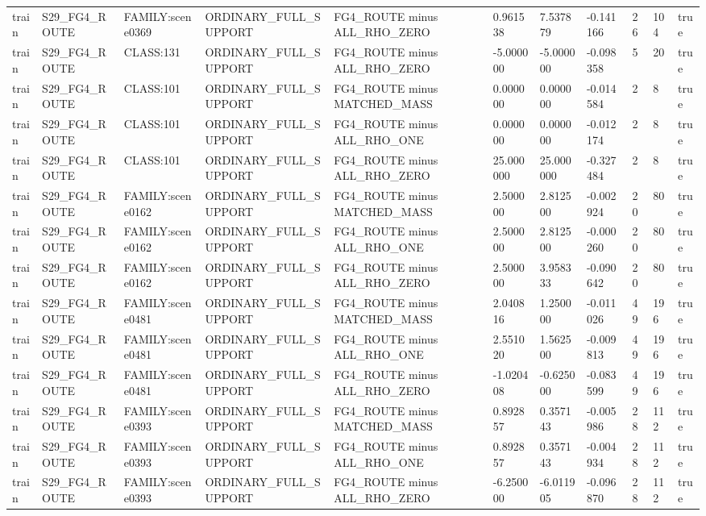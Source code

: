 \begin{tabular}{lllllllllll}
train & S29\_FG4\_ROUTE & FAMILY:scene0369 & ORDINARY\_FULL\_SUPPORT & FG4\_ROUTE minus ALL\_RHO\_ZERO & 0.961538 & 7.537879 & -0.141166 & 26 & 104 & true \\
train & S29\_FG4\_ROUTE & CLASS:131 & ORDINARY\_FULL\_SUPPORT & FG4\_ROUTE minus ALL\_RHO\_ZERO & -5.000000 & -5.000000 & -0.098358 & 5 & 20 & true \\
train & S29\_FG4\_ROUTE & CLASS:101 & ORDINARY\_FULL\_SUPPORT & FG4\_ROUTE minus MATCHED\_MASS & 0.000000 & 0.000000 & -0.014584 & 2 & 8 & true \\
train & S29\_FG4\_ROUTE & CLASS:101 & ORDINARY\_FULL\_SUPPORT & FG4\_ROUTE minus ALL\_RHO\_ONE & 0.000000 & 0.000000 & -0.012174 & 2 & 8 & true \\
train & S29\_FG4\_ROUTE & CLASS:101 & ORDINARY\_FULL\_SUPPORT & FG4\_ROUTE minus ALL\_RHO\_ZERO & 25.000000 & 25.000000 & -0.327484 & 2 & 8 & true \\
train & S29\_FG4\_ROUTE & FAMILY:scene0162 & ORDINARY\_FULL\_SUPPORT & FG4\_ROUTE minus MATCHED\_MASS & 2.500000 & 2.812500 & -0.002924 & 20 & 80 & true \\
train & S29\_FG4\_ROUTE & FAMILY:scene0162 & ORDINARY\_FULL\_SUPPORT & FG4\_ROUTE minus ALL\_RHO\_ONE & 2.500000 & 2.812500 & -0.000260 & 20 & 80 & true \\
train & S29\_FG4\_ROUTE & FAMILY:scene0162 & ORDINARY\_FULL\_SUPPORT & FG4\_ROUTE minus ALL\_RHO\_ZERO & 2.500000 & 3.958333 & -0.090642 & 20 & 80 & true \\
train & S29\_FG4\_ROUTE & FAMILY:scene0481 & ORDINARY\_FULL\_SUPPORT & FG4\_ROUTE minus MATCHED\_MASS & 2.040816 & 1.250000 & -0.011026 & 49 & 196 & true \\
train & S29\_FG4\_ROUTE & FAMILY:scene0481 & ORDINARY\_FULL\_SUPPORT & FG4\_ROUTE minus ALL\_RHO\_ONE & 2.551020 & 1.562500 & -0.009813 & 49 & 196 & true \\
train & S29\_FG4\_ROUTE & FAMILY:scene0481 & ORDINARY\_FULL\_SUPPORT & FG4\_ROUTE minus ALL\_RHO\_ZERO & -1.020408 & -0.625000 & -0.083599 & 49 & 196 & true \\
train & S29\_FG4\_ROUTE & FAMILY:scene0393 & ORDINARY\_FULL\_SUPPORT & FG4\_ROUTE minus MATCHED\_MASS & 0.892857 & 0.357143 & -0.005986 & 28 & 112 & true \\
train & S29\_FG4\_ROUTE & FAMILY:scene0393 & ORDINARY\_FULL\_SUPPORT & FG4\_ROUTE minus ALL\_RHO\_ONE & 0.892857 & 0.357143 & -0.004934 & 28 & 112 & true \\
train & S29\_FG4\_ROUTE & FAMILY:scene0393 & ORDINARY\_FULL\_SUPPORT & FG4\_ROUTE minus ALL\_RHO\_ZERO & -6.250000 & -6.011905 & -0.096870 & 28 & 112 & true \\

\end{tabular}
